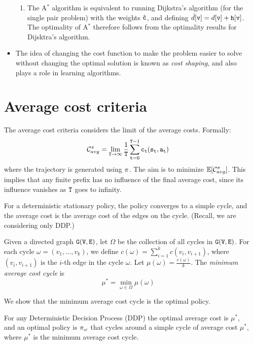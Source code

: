 \begin{itemize}
\begin{enumerate}
      \item The A$^*$ algorithm is equivalent to running Dijkstra's algorithm (for the single pair problem) with the weights $\hat{{\tt c}}$, and defining $\hat{d}[{\tt v}] = d[{\tt v}] + {\tt h}[{\tt v}]$. The optimality of A$^*$ therefore follows from the optimality results for Dijsktra's algorithm.
  \end{enumerate}
  \item The idea of changing the cost function to make the problem easier to solve without changing the optimal solution is known as \textit{cost shaping}, and also plays a role in learning algorithms.
\end{itemize}

\section{Average cost criteria}

The average cost criteria considers the limit of the average costs.
Formally:
\[
\mathcal{C}_{avg}^\pi=\lim_{{\tt T}\rightarrow \infty}
\frac{1}{{\tt T}} \sum_{{\tt t}=0}^{{\tt T}-1}
{\tt c}_{\tt t}({\tt s}_{\tt t},{\tt a}_{\tt t})
\]
where the trajectory is generated using $\pi$. The aim is to
minimize $\mathbb{E}[\mathcal{C}^\pi_{avg}]$. This implies that any finite
prefix has no influence of the final average cost, since its
influence vanishes as ${\tt T}$ goes to infinity.

For a deterministic stationary policy, the policy converges to a
simple cycle, and the average cost is the average cost of the edges
on the cycle. (Recall, we are considering only DDP.)

Given a directed graph ${\tt G}({\tt V},{\tt E})$, let $\Omega$ be the collection of
all cycles in ${\tt G}({\tt V},{\tt E})$. For each cycle $\omega=(v_1, \ldots ,
v_{k})$, we define $c(\omega)=\sum_{i=1}^k c(v_i,v_{i+1})$, where
$(v_i,v_{i+1})$ is the $i$-th edge in the cycle $\omega$. Let
$\mu(\omega)=\frac{c(\omega)}{k}$. The {\em minimum average cost cycle}
is
\[
\mu^*=\min_{\omega\in\Omega} \mu(\omega)
\]

We show that the minimum average cost cycle is the optimal policy.
\begin{theorem}
For any Deterministic Decision Process (DDP) the optimal average
cost is $\mu^*$, and an optimal policy is $\pi_{\omega}$ that
cycles around a simple cycle of average cost $\mu^*$, where $\mu^*$ is the minimum average cost cycle.
\end{theorem}

